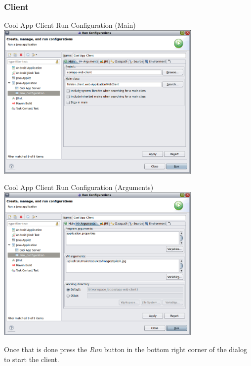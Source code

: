   \subsubsection*{Client}


  \begin{image}{Cool App Client Run Configuration (Main)}{\label{img:ch00:02:client-module-run-config-main-tab}}    
    \includegraphics[width=0.75\textwidth]{parts/00-part/chapters/01-application-modules/images/15-client-module-run-config-main-tab.png}
  \end{image}

  \begin{image}{Cool App Client Run Configuration (Arguments)}{\label{img:ch00:02:client-module-run-config-arguments-tab}}    
    \includegraphics[width=0.75\textwidth]{parts/00-part/chapters/01-application-modules/images/16-client-module-run-config-arguments-tab.png}
  \end{image}

  Once that is done press the \emph{Run} button in the bottom right corner of the dialog to start the client.
